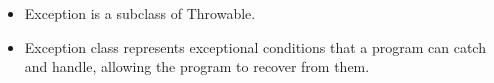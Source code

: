 \setlength{\columnsep}{3pt}
\begin{flushleft}

	\begin{itemize}
		\item Exception is a subclass of Throwable.
		\item Exception class represents exceptional conditions that a program can catch and handle, allowing the program to recover from them.
		
		
	\end{itemize}

\end{flushleft}

\newpage


